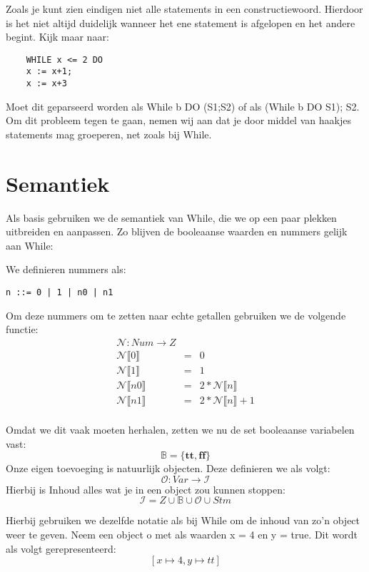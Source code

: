 \documentclass[12pt]{article}
\begin{document}
Zoals je kunt zien eindigen niet alle statements in een constructiewoord. Hierdoor is het niet altijd duidelijk wanneer het ene statement is afgelopen en het andere begint. Kijk maar naar:
\begin{lstlisting}
	WHILE x <= 2 DO
	x := x+1;
	x := x+3
\end{lstlisting}
Moet dit geparseerd worden als While b DO (S1;S2) of als (While b DO S1); S2. Om dit probleem tegen te gaan, nemen wij aan dat je door middel van haakjes statements mag groeperen, net zoals bij While.
\pagebreak
\section{Semantiek}

Als basis gebruiken we de semantiek van While, die we op een paar plekken uitbreiden en aanpassen.
Zo blijven de booleaanse waarden en nummers gelijk aan While:

We definieren nummers als:
\begin{lstlisting}
n ::= 0 | 1 | n0 | n1
\end{lstlisting}

Om deze nummers om te zetten naar echte getallen gebruiken we de volgende functie:
$$
\begin{matrix}
\mathcal{N}: Num \rightarrow Z \\
\mathcal{N}\llbracket 0 \rrbracket &= &0  \\
\mathcal{N}\llbracket 1 \rrbracket &= &1 \\
\mathcal{N}\llbracket n0 \rrbracket &= &2 * \mathcal{N}\llbracket n \rrbracket \\
\mathcal{N}\llbracket n1 \rrbracket &= &2 * \mathcal{N}\llbracket n \rrbracket + 1 \\
\end{matrix}
$$

Omdat we dit vaak moeten herhalen, zetten we nu de set booleaanse variabelen vast:
$$ \mathds{B} = \{\boldsymbol{tt},\boldsymbol{ff}\} $$
Onze eigen toevoeging is natuurlijk objecten. Deze definieren we als volgt:
$$\mathcal{O} : Var \rightarrow \mathcal{I}$$ 
Hierbij is Inhoud alles wat je in een object zou kunnen stoppen: 
$$\mathcal{I} = Z \cup \mathds{B} \cup \mathcal{O} \cup Stm$$ 

Hierbij gebruiken we dezelfde notatie als bij While om de inhoud van zo'n object weer te geven.
Neem een object o met als waarden x = 4 en y = true. Dit wordt als volgt gerepresenteerd:
$$[x \mapsto 4, y \mapsto tt]$$
\end{document}
